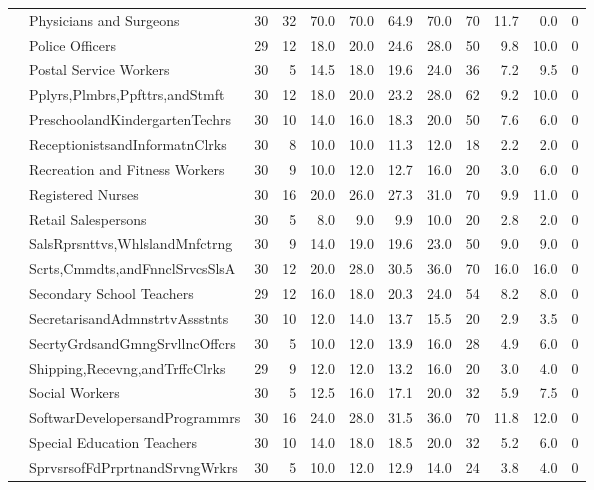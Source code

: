 {\begin{longtable}{llrrrrrrrrrr}
   & Physicians and Surgeons &   30 & 32 & 70.0 & 70.0 & 64.9 & 70.0 & 70 & 11.7 &  0.0 & 0 \\ 
   & Police Officers &   29 & 12 & 18.0 & 20.0 & 24.6 & 28.0 & 50 &  9.8 & 10.0 & 0 \\ 
   & Postal Service Workers &   30 &  5 & 14.5 & 18.0 & 19.6 & 24.0 & 36 &  7.2 &  9.5 & 0 \\ 
   & Pplyrs,Plmbrs,Ppfttrs,andStmft &   30 & 12 & 18.0 & 20.0 & 23.2 & 28.0 & 62 &  9.2 & 10.0 & 0 \\ 
   & PreschoolandKindergartenTechrs &   30 & 10 & 14.0 & 16.0 & 18.3 & 20.0 & 50 &  7.6 &  6.0 & 0 \\ 
   & ReceptionistsandInformatnClrks &   30 &  8 & 10.0 & 10.0 & 11.3 & 12.0 & 18 &  2.2 &  2.0 & 0 \\ 
   & Recreation and Fitness Workers &   30 &  9 & 10.0 & 12.0 & 12.7 & 16.0 & 20 &  3.0 &  6.0 & 0 \\ 
   & Registered Nurses &   30 & 16 & 20.0 & 26.0 & 27.3 & 31.0 & 70 &  9.9 & 11.0 & 0 \\ 
   & Retail Salespersons &   30 &  5 &  8.0 &  9.0 &  9.9 & 10.0 & 20 &  2.8 &  2.0 & 0 \\ 
   & SalsRprsnttvs,WhlslandMnfctrng &   30 &  9 & 14.0 & 19.0 & 19.6 & 23.0 & 50 &  9.0 &  9.0 & 0 \\ 
   & Scrts,Cmmdts,andFnnclSrvcsSlsA &   30 & 12 & 20.0 & 28.0 & 30.5 & 36.0 & 70 & 16.0 & 16.0 & 0 \\ 
   & Secondary School Teachers &   29 & 12 & 16.0 & 18.0 & 20.3 & 24.0 & 54 &  8.2 &  8.0 & 0 \\ 
   & SecretarisandAdmnstrtvAssstnts &   30 & 10 & 12.0 & 14.0 & 13.7 & 15.5 & 20 &  2.9 &  3.5 & 0 \\ 
   & SecrtyGrdsandGmngSrvllncOffcrs &   30 &  5 & 10.0 & 12.0 & 13.9 & 16.0 & 28 &  4.9 &  6.0 & 0 \\ 
   & Shipping,Recevng,andTrffcClrks &   29 &  9 & 12.0 & 12.0 & 13.2 & 16.0 & 20 &  3.0 &  4.0 & 0 \\ 
   & Social Workers &   30 &  5 & 12.5 & 16.0 & 17.1 & 20.0 & 32 &  5.9 &  7.5 & 0 \\ 
   & SoftwarDevelopersandProgrammrs &   30 & 16 & 24.0 & 28.0 & 31.5 & 36.0 & 70 & 11.8 & 12.0 & 0 \\ 
   & Special Education Teachers &   30 & 10 & 14.0 & 18.0 & 18.5 & 20.0 & 32 &  5.2 &  6.0 & 0 \\ 
   & SprvsrsofFdPrprtnandSrvngWrkrs &   30 &  5 & 10.0 & 12.0 & 12.9 & 14.0 & 24 &  3.8 &  4.0 & 0 \\ 

\end{longtable}}
